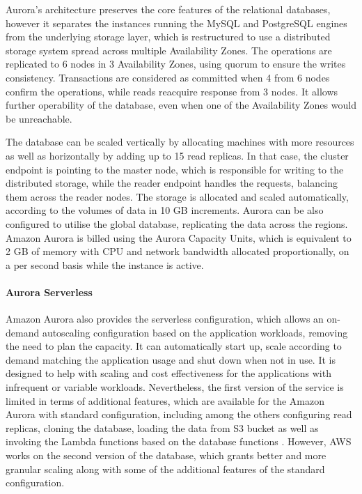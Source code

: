 Aurora’s architecture preserves the core features of the relational databases, however it separates the instances running the MySQL and PostgreSQL engines from the underlying storage layer, which is restructured to use a distributed storage system spread across multiple Availability Zones.
The operations are replicated to 6 nodes in 3 Availability Zones, using quorum to ensure the writes consistency.
Transactions are considered as committed when 4 from 6 nodes confirm the operations, while reads reacquire response from 3 nodes. 
It allows further operability of the database, even when one of the Availability Zones would be unreachable.

The database can be scaled vertically by allocating machines with more resources as well as horizontally by adding up to 15 read replicas.
In that case, the cluster endpoint is pointing to the master node, which is responsible for writing to the distributed storage, while the reader endpoint handles the requests, balancing them across the reader nodes.
The storage is allocated and scaled automatically, according to the volumes of data in 10 GB increments.
Aurora can be also configured to utilise the global database, replicating the data across the regions.
Amazon Aurora is billed using the Aurora Capacity Units, which is equivalent to 2 GB of memory with CPU and network bandwidth allocated proportionally, on a per second basis while the instance is active.

\paragraph{Aurora Serverless}

Amazon Aurora also provides the serverless configuration, which allows an on-demand autoscaling configuration based on the application workloads, removing the need to plan the capacity.
It can automatically start up, scale according to demand matching the application usage and shut down when not in use.
It is designed to help with scaling and cost effectiveness for the applications with infrequent or variable workloads.
Nevertheless, the first version of the service is limited in terms of additional features, which are available for the Amazon Aurora with standard configuration, including among the others configuring read replicas, cloning the database, loading the data from S3 bucket as well as invoking the Lambda functions based on the database functions \cite{AuroraServerless}.
However, AWS works on the second version of the database, which grants better and more granular scaling along with some of the additional features of the standard configuration.


